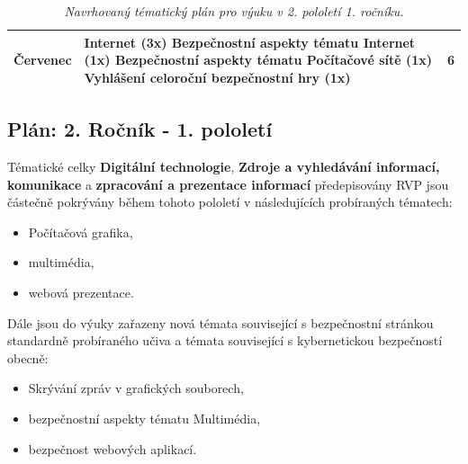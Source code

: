 \documentclass[a4paper, 12pt]{article}
\begin{document}
\begin{table}[h!]
\begin{tabular}{| l | p{11cm} | p{2cm} |}
    Červenec &
        Internet (3x) \newline
        Bezpečnostní aspekty tématu Internet (1x) \newline
        Bezpečnostní aspekty tématu Počítačové sítě (1x) \newline
        Vyhlášení celoroční bezpečnostní hry (1x) &
        6 \newline 1 \newline 1 \newline 1
    \\ \hline
\end{tabular}
\caption{\textit{Navrhovaný tématický plán pro výuku v 2. pololetí 1. ročníku.}}
\end{table}


\subsection{Plán: 2. Ročník - 1. pololetí}
Tématické celky \textbf{Digitální technologie}, \textbf{Zdroje a vyhledávání informací, komunikace} a \textbf{zpracování a prezentace informací} předepisovány RVP jsou částečně pokrývány během tohoto pololetí v následujících probíraných tématech:
\begin{itemize}
    \setlength{\itemsep}{-3pt}
    \item Počítačová grafika,
    \item multimédia,
    \item webová prezentace.
\end{itemize}

Dále jsou do výuky zařazeny nová témata související s bezpečnostní stránkou standardně probíraného učiva a témata související s kybernetickou bezpečností obecně:
\begin{itemize}
    \setlength{\itemsep}{-3pt}
    \item Skrývání zpráv v grafických souborech,
    \item bezpečnostní aspekty tématu Multimédia,
    \item bezpečnost webových aplikací.
\end{itemize}
\end{document}
